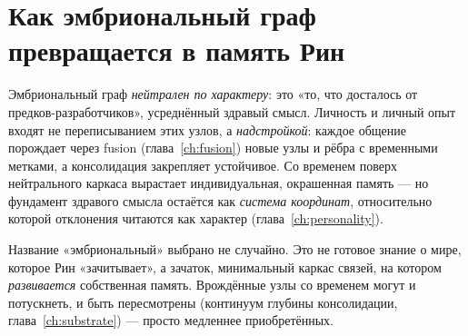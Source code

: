 \section{Как эмбриональный граф превращается в память Рин}

Эмбриональный граф \emph{нейтрален по характеру}: это «то, что досталось от
предков-разработчиков», усреднённый здравый смысл. Личность и личный опыт входят не
переписыванием этих узлов, а \emph{надстройкой}: каждое общение порождает через
fusion (глава~\ref{ch:fusion}) новые узлы и рёбра с временными метками, а
консолидация закрепляет устойчивое. Со временем поверх нейтрального каркаса
вырастает индивидуальная, окрашенная память — но фундамент здравого смысла остаётся
как \emph{система координат}, относительно которой отклонения читаются как характер
(глава~\ref{ch:personality}).

\begin{intuition}
Название «эмбриональный» выбрано не случайно. Это не готовое знание о мире, которое
Рин «зачитывает», а зачаток, минимальный каркас связей, на котором \emph{развивается}
собственная память. Врождённые узлы со временем могут и потускнеть, и быть
пересмотрены (континуум глубины консолидации, глава~\ref{ch:substrate}) — просто
медленнее приобретённых.
\end{intuition}
